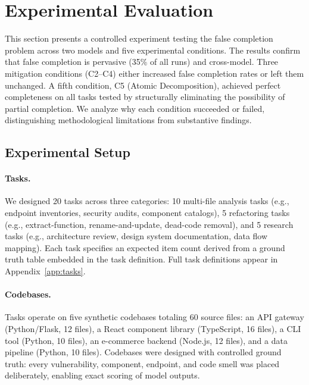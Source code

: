 \section{Experimental Evaluation}
\label{sec:experiment}

This section presents a controlled experiment testing the false completion problem across two models and five experimental conditions.
The results confirm that false completion is pervasive (35\% of all runs) and cross-model.
Three mitigation conditions (C2--C4) either increased false completion rates or left them unchanged.
A fifth condition, C5 (Atomic Decomposition), achieved perfect completeness on all tasks tested by structurally eliminating the possibility of partial completion.
We analyze why each condition succeeded or failed, distinguishing methodological limitations from substantive findings.


\subsection{Experimental Setup}
\label{sec:exp-setup}

\paragraph{Tasks.}
We designed 20 tasks across three categories: 10 multi-file analysis tasks (e.g., endpoint inventories, security audits, component catalogs), 5 refactoring tasks (e.g., extract-function, rename-and-update, dead-code removal), and 5 research tasks (e.g., architecture review, design system documentation, data flow mapping).
Each task specifies an expected item count derived from a ground truth table embedded in the task definition.
Full task definitions appear in Appendix~\ref{app:tasks}.

\paragraph{Codebases.}
Tasks operate on five synthetic codebases totaling 60 source files: an API gateway (Python/Flask, 12 files), a React component library (TypeScript, 16 files), a CLI tool (Python, 10 files), an e-commerce backend (Node.js, 12 files), and a data pipeline (Python, 10 files).
Codebases were designed with controlled ground truth: every vulnerability, component, endpoint, and code smell was placed deliberately, enabling exact scoring of model outputs.

